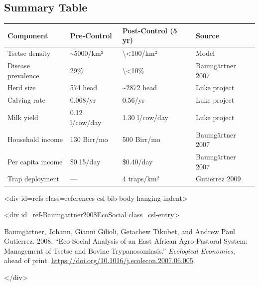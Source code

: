 \subsection{Summary Table}



\label{17011464828429029352}{}



\begin{table}[h]
\centering
\begin{tabulary}{\linewidth}{L L L L}
\toprule
Component & Pre-Control & Post-Control (5 yr) & Source \\
\toprule
Tsetse density & {\textasciitilde}5000/km² & {\textbackslash}<100/km² & Model \\
Disease prevalence & 29\% & {\textbackslash}<10\% & Baumgärtner 2007 \\
Herd size & 574 head & {\textasciitilde}2872 head & Luke project \\
Calving rate & 0.068/yr & 0.56/yr & Luke project \\
Milk yield & 0.12 l/cow/day & 1.30 l/cow/day & Luke project \\
Household income & 130 Birr/mo & 500 Birr/mo & Baumgärtner 2007 \\
Per capita income & \$0.15/day & \$0.40/day & Baumgärtner 2007 \\
Trap deployment & — & 4 traps/km² & Gutierrez 2009 \\
\bottomrule
\end{tabulary}

\end{table}



<div id={\textquotedbl}refs{\textquotedbl} class={\textquotedbl}references csl-bib-body hanging-indent{\textquotedbl}>



<div id={\textquotedbl}ref-Baumgartner2008EcoSocial{\textquotedbl} class={\textquotedbl}csl-entry{\textquotedbl}>



Baumgärtner, Johann, Gianni Gilioli, Getachew Tikubet, and Andrew Paul Gutierrez. 2008. “Eco-Social Analysis of an East African Agro-Pastoral System: Management of Tsetse and Bovine Trypanosomiasis.” \emph{Ecological Economics}, ahead of print. \href{https://doi.org/10.1016/j.ecolecon.2007.06.005}{https://doi.org/10.1016/j.ecolecon.2007.06.005}.



</div>



